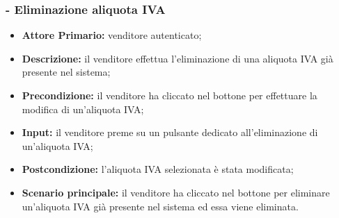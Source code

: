 \stepsubUserCase
\subsubsection{- Eliminazione aliquota IVA}
\begin{itemize}
    \item \textbf{Attore Primario:} venditore autenticato;
    \item \textbf{Descrizione:} il venditore effettua l'eliminazione di una aliquota IVA già presente nel sistema;
    \item \textbf{Precondizione:} il venditore ha cliccato nel bottone per effettuare la modifica di un’aliquota IVA;
    \item \textbf{Input:} il venditore preme su un pulsante dedicato all'eliminazione di un'aliquota IVA;
    \item \textbf{Postcondizione:} l'aliquota IVA selezionata è stata modificata;
    \item \textbf{Scenario principale:} il venditore ha cliccato nel bottone per eliminare un’aliquota IVA già presente nel sistema ed essa viene eliminata.
\end{itemize}

\stepUserCase
